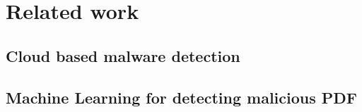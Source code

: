 \chapter{Related work}
\label{chapter:relatedWork}


\section{Cloud based malware detection}
\label{section:relatedWorkCloud}

\section{Machine Learning for detecting malicious PDF}
\label{section:relatedWorkML}